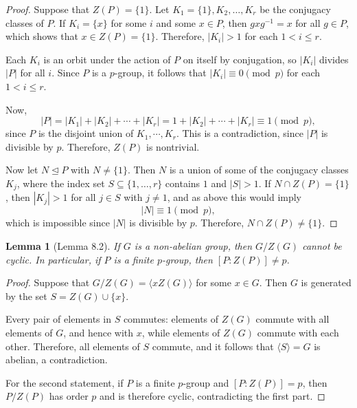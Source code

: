 \documentclass[titlepage]{article}
\theoremstyle{plain}
\newtheorem{lemma}[theorem]{Lemma}
\theoremstyle{definition}
\theoremstyle{remark}
\theoremstyle{exercise-style}
\numberwithin{equation}{section}
\numberwithin{theorem}{section}
\numberwithin{remark}{section}
\begin{document}
\begin{proof}
    Suppose that $Z(P) = \{1\}$. Let $K_1 = \{1\}, K_2, \dots, K_r$ be the conjugacy classes of $P$. 
    If $K_i = \{x\}$ for some $i$ and some $x \in P$, then $gxg^{-1} = x$ for all $g \in P$, 
    which shows that $x \in Z(P) = \{1\}$. Therefore, $|K_i| > 1$ for each $1 <i \leq r$.
    
    Each $K_i$ is an orbit under the action of $P$ on itself by conjugation, so $|K_i|$ divides $|P|$ 
    for all $i$. Since $P$ is a $p$-group, it follows that $|K_i| \equiv 0 \pmod{p}$ for each $1 <i \leq r$.
    
    Now,
    \[
    |P| = |K_1| + |K_2| + \cdots + |K_r| = 1 + |K_2| + \cdots + |K_r| \equiv 1 \pmod{p},
    \]
    since $P$ is the disjoint union of $K_1, \cdots, K_r$. This is a contradiction, since $|P|$ is divisible by $p$. Therefore, $Z(P)$ is nontrivial.
    
    Now let $N \trianglelefteq P$ with $N \neq \{1\}$. Then $N$ is a union of some of the conjugacy 
    classes $K_j$, where the index set $S \subseteq \{1, \dots, r\}$ contains $1$ and $|S| > 1$. 
    If $N \cap Z(P) = \{1\}$, then $|K_j| > 1$ for all $j \in S$ with $j \neq 1$, and as above 
    this would imply
    \[
    |N| \equiv 1 \pmod{p},
    \]
    which is impossible since $|N|$ is divisible by $p$. Therefore, 
    $N \cap Z(P) \neq \{1\}$.
\end{proof}

\begin{myboxg}
    \begin{lemma}[Lemma 8.2]
        If $G$ is a non-abelian group, then $G/Z(G)$ cannot be cyclic. 
        In particular, if $P$ is a finite $p$-group, then $[P : Z(P)] \neq p$.
    \end{lemma}
\end{myboxg}

\begin{proof}
    Suppose that $G/Z(G) = \langle xZ(G) \rangle$ for some $x \in G$. 
    Then $G$ is generated by the set $S = Z(G) \cup \{x\}$.
    
    Every pair of elements in $S$ commutes: elements of $Z(G)$ commute with all elements of $G$, 
    and hence with $x$, while elements of $Z(G)$ commute with each other. Therefore, all elements 
    of $S$ commute, and it follows that $\langle S \rangle = G$ is abelian, a contradiction.
    
    For the second statement, if $P$ is a finite $p$-group and $[P : Z(P)] = p$, then 
    $P/Z(P)$ has order $p$ and is therefore cyclic, contradicting the first part. 
\end{proof}
\end{document}
